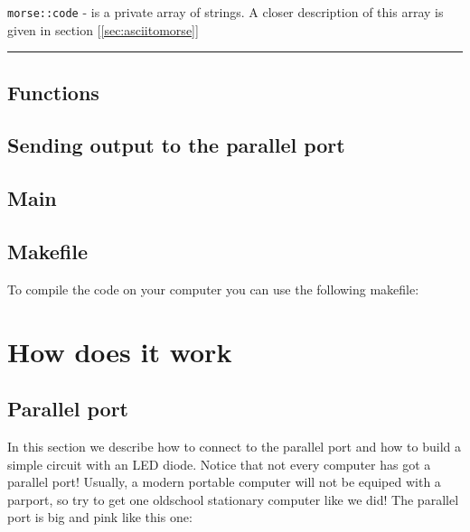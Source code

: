 \documentclass[12pt]{report}
\begin{document}
\verb|morse::code| - is a private array of strings. A closer description of this array is given in section [\ref{sec:asciitomorse}]

\rule{\textwidth}{0.5pt}

\subsection{Functions}










\subsection{Sending output to the parallel port}



\subsection{Main}



\subsection{Makefile}

To compile the code on your computer you can use the following makefile:




\section{How does it work}

\newpage

\subsection{Parallel port}

In this section we describe how to connect to the parallel port and how to build a simple circuit with an LED diode. Notice that not every computer has got a parallel port! Usually, a modern portable computer will not be equiped with a parport, so try to get one oldschool stationary computer like we did! The parallel port is big and pink like this one:
\end{document}
